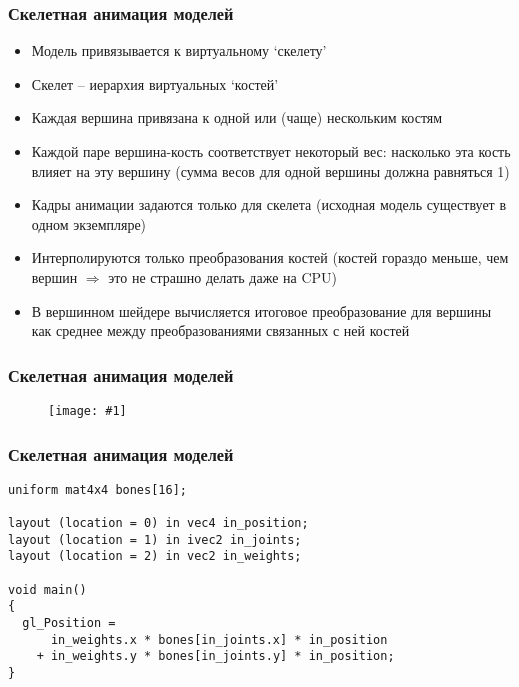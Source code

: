\documentclass{beamer}
\newcommand{\slideimage}[1]{
  \begin{figure}
    \begin{adjustbox}{width=\textwidth, totalheight=\textheight-2\baselineskip-2\baselineskip,keepaspectratio}
      \texttt{[image: \#1]}
    \end{adjustbox}
  \end{figure}
}
\begin{document}
\begin{frame}[fragile]
\frametitle{Скелетная анимация моделей}
\begin{itemize}
\item Модель привязывается к виртуальному `скелету'
\pause
\item Скелет -- иерархия виртуальных `костей'
\pause
\item Каждая вершина привязана к одной или (чаще) нескольким костям
\pause
\item Каждой паре вершина-кость соответствует некоторый вес: насколько эта кость влияет на эту вершину (сумма весов для одной вершины должна равняться 1)
\pause
\item Кадры анимации задаются только для скелета (исходная модель существует в одном экземпляре)
\pause
\item Интерполируются только преобразования костей (костей гораздо меньше, чем вершин \begin{math}\Rightarrow\end{math} это не страшно делать даже на CPU)
\pause
\item В вершинном шейдере вычисляется итоговое преобразование для вершины как среднее между преобразованиями связанных с ней костей
\end{itemize}
\end{frame}

\begin{frame}[fragile]
\frametitle{Скелетная анимация моделей}
\slideimage{skeletal.jpg}
\end{frame}

\begin{frame}[fragile]
\frametitle{Скелетная анимация моделей}
\begin{verbatim}
uniform mat4x4 bones[16];

layout (location = 0) in vec4 in_position;
layout (location = 1) in ivec2 in_joints;
layout (location = 2) in vec2 in_weights;

void main()
{
  gl_Position =
      in_weights.x * bones[in_joints.x] * in_position
    + in_weights.y * bones[in_joints.y] * in_position;
}
\end{verbatim}
\end{frame}
\end{document}
